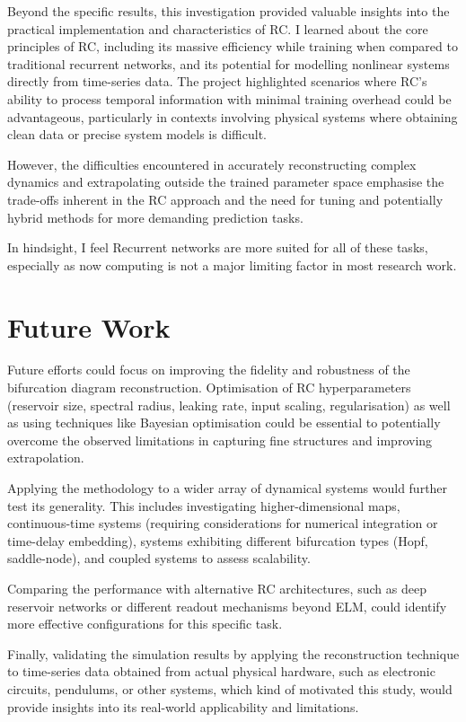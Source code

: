 \documentclass[numbered]{ivt-style/standard}
\begin{document}
Beyond the specific results, this investigation provided valuable insights into the practical implementation and characteristics of RC. I learned about the core principles of RC, including its massive efficiency while training when compared to traditional recurrent networks, and its potential for modelling nonlinear systems directly from time-series data. The project highlighted scenarios where RC's ability to process temporal information with minimal training overhead could be advantageous, particularly in contexts involving physical systems where obtaining clean data or precise system models is difficult. 

However, the difficulties encountered in accurately reconstructing complex dynamics and extrapolating outside the trained parameter space emphasise the trade-offs inherent in the RC approach and the need for tuning and potentially hybrid methods for more demanding prediction tasks. 

In hindsight, I feel Recurrent networks are more suited for all of these tasks, especially as now computing is not a major limiting factor in most research work. 

\section{Future Work}

Future efforts could focus on improving the fidelity and robustness of the bifurcation diagram reconstruction. Optimisation of RC hyperparameters (reservoir size, spectral radius, leaking rate, input scaling, regularisation) as well as using techniques like Bayesian optimisation could be essential to potentially overcome the observed limitations in capturing fine structures and improving extrapolation. 

Applying the methodology to a wider array of dynamical systems would further test its generality. This includes investigating higher-dimensional maps, continuous-time systems (requiring considerations for numerical integration or time-delay embedding), systems exhibiting different bifurcation types (Hopf, saddle-node), and coupled systems to assess scalability. 

Comparing the performance with alternative RC architectures, such as deep reservoir networks or different readout mechanisms beyond ELM, could identify more effective configurations for this specific task. 

Finally, validating the simulation results by applying the reconstruction technique to time-series data obtained from actual physical hardware, such as electronic circuits, pendulums, or other systems, which kind of motivated this study, would provide insights into its real-world applicability and limitations.
\end{document}
